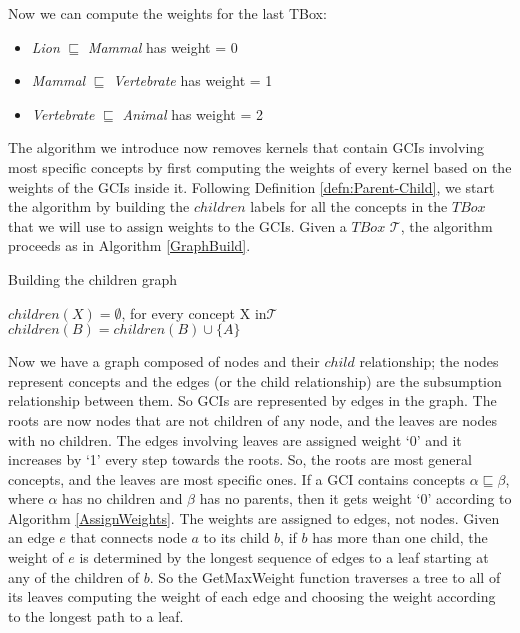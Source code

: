 Now we can compute the weights for the last TBox:

\begin{itemize}
\item \textit{Lion} $\sqsubseteq$ \textit{Mammal} has weight = 0
\item \textit{Mammal} $\sqsubseteq$ \textit{Vertebrate} has weight = 1
\item \textit{Vertebrate} $\sqsubseteq$ \textit{Animal} has weight = 2
\end{itemize}

The algorithm we introduce now removes kernels that contain GCIs involving most specific concepts by first computing the weights of every kernel based on the weights of the GCIs inside it. Following Definition \ref{defn:Parent-Child}, we start the algorithm by building the $children$ labels for all the concepts in the $TBox$ that we will use to assign weights to the GCIs. Given a $TBox$ $\mathcal{T}$, the algorithm proceeds as in Algorithm \ref{GraphBuild}.

\begin{algorithm}
\caption{Building the children graph}
\label{GraphBuild}
\begin{algorithmic}[1]
\State $children(X) = \emptyset$, for every concept X in$\mathcal{T}$
\State $children(B) = children(B) \cup \{ A \}$
\EndFor
\EndFunction
\end{algorithmic}
\end{algorithm}

Now we have a graph composed of nodes and their $child$ relationship; the nodes represent concepts and the edges (or the child relationship) are the subsumption relationship between them. So GCIs are represented by edges in the graph. The roots are now nodes that are not children of any node, and the leaves are nodes with no children. The edges involving leaves are assigned weight `0' and it increases by `1' every step towards the roots. So, the roots are most general concepts, and the leaves are most specific ones. If a GCI contains concepts $\alpha \sqsubseteq \beta$, where $\alpha$ has no children and $\beta$ has no parents, then it gets weight `0' according to Algorithm \ref{AssignWeights}. The weights are assigned to edges, not nodes. Given an edge $e$ that connects node $a$ to its child $b$, if $b$ has more than one child, the weight of $e$ is determined by the longest sequence of edges to a leaf starting at any of the children of $b$. So the GetMaxWeight function traverses a tree to all of its leaves computing the weight of each edge and choosing the weight according to the longest path to a leaf.

